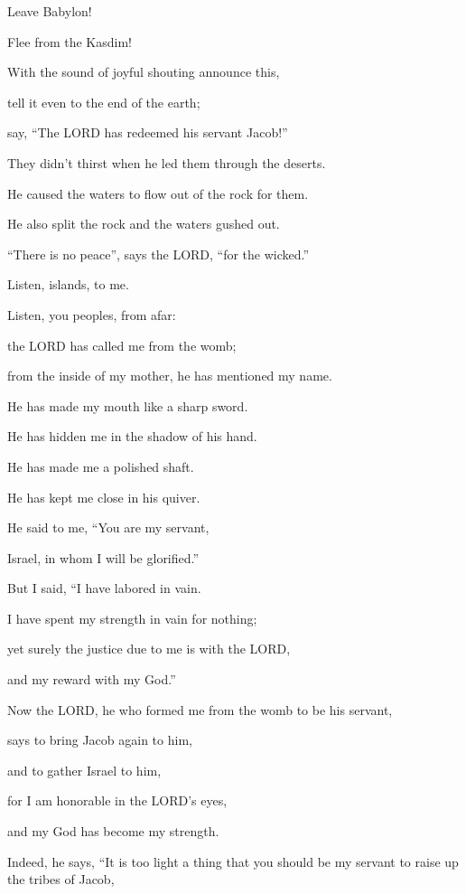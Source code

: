 \vspace{\baselineskip} \myverse{}Leave Babylon!

Flee from the Kasdim!

With the sound of joyful shouting announce this,

tell it even to the end of the earth;

say, “The LORD has redeemed his servant Jacob!”

\myverse{}They didn’t thirst when he led them through the deserts.

He caused the waters to flow out of the rock for them.

He also split the rock and the waters gushed out.


\vspace{\baselineskip} \myverse{}“There is no peace”, says the LORD, “for the wicked.”


\mychapter{} \myverse*{}Listen, islands, to me.

\quad\quad Listen, you peoples, from afar:

the LORD has called me from the womb;

from the inside of my mother, he has mentioned my name.

\myverse{}He has made my mouth like a sharp sword.

He has hidden me in the shadow of his hand.

He has made me a polished shaft.

He has kept me close in his quiver.

\myverse{}He said to me, “You are my servant,

Israel, in whom I will be glorified.”

\myverse{}But I said, “I have labored in vain.

I have spent my strength in vain for nothing;

yet surely the justice due to me is with the LORD,

and my reward with my God.”


\vspace{\baselineskip} \myverse{}Now the LORD, he who formed me from the womb to be his servant,

says to bring Jacob again to him,

and to gather Israel to him,

for I am honorable in the LORD’s eyes,

and my God has become my strength.

\myverse{}Indeed, he says, “It is too light a thing that you should be
my servant to raise up the tribes of Jacob,

